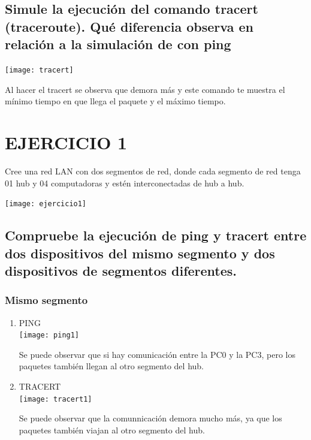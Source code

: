  \subsection{Simule la ejecuci\'on del comando tracert (traceroute). Qu\'e diferencia observa en relaci\'on a la simulaci\'on de con ping}
 \texttt{[image: tracert]}
\begin{definicion}[]
{
 Al hacer el tracert se observa que demora m\'as y este comando te muestra el m\'inimo tiempo en que llega el paquete y el m\'aximo tiempo.
}
\end{definicion} 


\section{EJERCICIO 1}
\begin{definicion}[]{
Cree una red LAN con dos segmentos de red, donde cada segmento
de red tenga 01 hub y 04 computadoras y est\'en interconectadas
de hub a hub.
}
\end{definicion}

\begin{caja}{
\texttt{[image: ejercicio1]}
}
\end{caja}

\subsection{Compruebe la ejecuci\'on de ping y tracert entre dos dispositivos del mismo segmento y dos dispositivos de segmentos diferentes.}
\subsubsection{Mismo segmento}
	\begin{enumerate}[label=\itembolasazules{}]
\item PING
\\
 \texttt{[image: ping1]}
\begin{definicion}[]
{
Se puede observar que si hay comunicaci\'on entre la PC0 y la PC3, pero los paquetes tambi\'en llegan al otro segmento del hub.
}
\end{definicion} 
\item TRACERT
\\
\texttt{[image: tracert1]}
\begin{definicion}[]
{
Se puede observar que la comunnicaci\'on demora mucho m\'as, ya que los paquetes tambi\'en viajan al otro segmento del hub.
}
\end{definicion} 
\end{enumerate}

